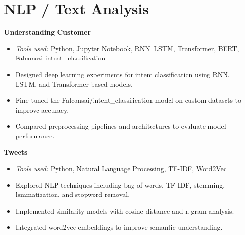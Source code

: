 \documentclass[a4paper,11pt]{article}%
\begin{document}
\section*{NLP / Text Analysis}%
%
\noindent \textbf{Understanding Customer} - \href{https://github.com/sboof911/Understanding-customer}{{}}%
\begin{itemize}[leftmargin=2em,label={},parsep=0pt,topsep=1em]%
\item \textit{Tools used:} Python, Jupyter Notebook, RNN, LSTM, Transformer, BERT, Falconsai intent\_classification%
\item Designed deep learning experiments for intent classification using RNN, LSTM, and Transformer-based models.%
\item Fine-tuned the Falconsai/intent\_classification model on custom datasets to improve accuracy.%
\item Compared preprocessing pipelines and architectures to evaluate model performance.%
\end{itemize}%
%
\noindent \textbf{Tweets} - \href{https://github.com/sboof911/tweets}{{}}%
\begin{itemize}[leftmargin=2em,label={},parsep=0pt,topsep=1em]%
\item \textit{Tools used:} Python, Natural Language Processing, TF-IDF, Word2Vec%
\item Explored NLP techniques including bag-of-words, TF-IDF, stemming, lemmatization, and stopword removal.%
\item Implemented similarity models with cosine distance and n-gram analysis.%
\item Integrated word2vec embeddings to improve semantic understanding.%
\end{itemize}%
\end{document}

